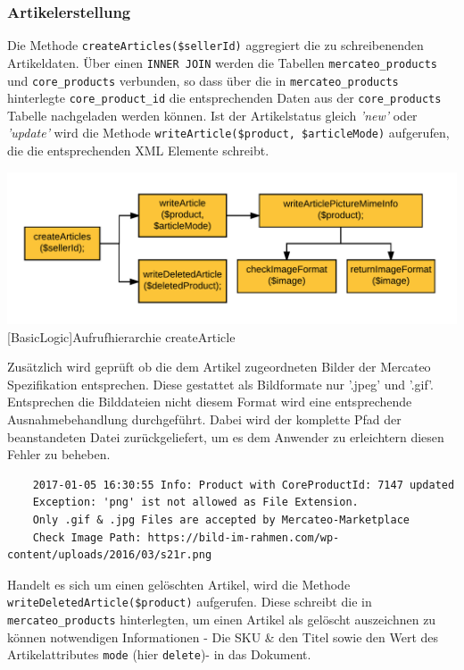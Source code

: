 	\subsubsection{Artikelerstellung}
	
	Die Methode \texttt{createArticles(\$sellerId)} aggregiert die zu schreibenenden Artikeldaten. Über einen \texttt{INNER JOIN} werden die Tabellen \texttt{mercateo\_products} und \texttt{core\_products} verbunden, so dass über die in \texttt{mercateo\_products} hinterlegte \texttt{core\_product\_id} die entsprechenden Daten aus der \texttt{core\_products} Tabelle nachgeladen werden können. 
	Ist der Artikelstatus gleich \textit{'new'} oder \textit{'update'} wird die Methode \texttt{writeArticle(\$product, \$articleMode)} aufgerufen, die die entsprechenden XML Elemente schreibt. \\
		
		\begin{minipage}{\linewidth}
			\vspace{1em}
			\centering
			\includegraphics[width=0.7 \linewidth]{img/createArticleHierarchie}
			[BasicLogic]{Aufrufhierarchie createArticle}
			\vspace{1em}
		\end{minipage}
	
	Zusätzlich wird geprüft ob die dem Artikel zugeordneten Bilder der Mercateo Spezifikation entsprechen. Diese gestattet als Bildformate nur '.jpeg' und '.gif'. Entsprechen die Bilddateien nicht diesem Format wird eine entsprechende Ausnahmebehandlung durchgeführt. Dabei wird der komplette Pfad der beanstandeten Datei zurückgeliefert, um es dem Anwender zu erleichtern diesen Fehler zu beheben.\\
	
	\begin{lstlisting}
	2017-01-05 16:30:55 Info: Product with CoreProductId: 7147 updated
	Exception: 'png' ist not allowed as File Extension.
	Only .gif & .jpg Files are accepted by Mercateo-Marketplace
	Check Image Path: https://bild-im-rahmen.com/wp-content/uploads/2016/03/s21r.png
	\end{lstlisting}

	Handelt es sich um einen gelöschten Artikel, wird die Methode \texttt{writeDeletedArticle(\$pro\-duct)} aufgerufen. Diese schreibt die in \texttt{mercateo\_products} hinterlegten, um einen Artikel als gelöscht auszeichnen zu können notwendigen Informationen - Die SKU \& den Titel sowie den Wert des Artikelattributes \texttt{mode} (hier \texttt{delete})- in das Dokument.
	

